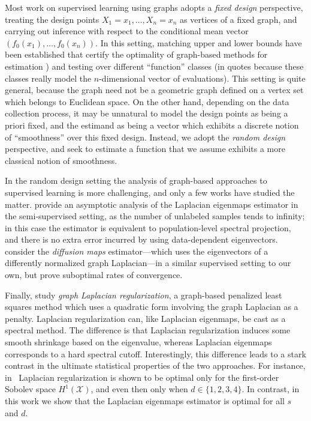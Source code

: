 \documentclass[aos]{imsart}
\theoremstyle{plain}
\theoremstyle{definition}
\theoremstyle{remark}
\newcommand{\mc}[1]{\mathcal{#1}}
\newcommand{\1}{\mathbf{1}}
\begin{document}
Most work on supervised learning using graphs adopts a \emph{fixed design} perspective, treating the design points $X_1 = x_1,\ldots,X_n = x_n$ as vertices of a fixed graph, and carrying out inference with respect to the conditional mean vector $(f_0(x_1),\ldots,f_0(x_n))$. In this setting, matching upper and lower bounds have been established that certify the optimality of graph-based methods for estimation \citep{wang2016,hutter2016,sadhanala16,sadhanala17,kirichenko2017,kirichenko2018}) and testing \citep{sharpnack2010identifying,sharpnack2013b,sharpnack2013,sharpnack2015} over different ``function'' classes (in quotes because these classes really model the $n$-dimensional vector of evaluations). This setting is quite general, because the graph need not be a geometric graph defined on a vertex set which belongs to Euclidean space. On the other hand, depending on the data collection process, it may be unnatural to model the design points as being a priori fixed, and the estimand as being a vector which exhibits a discrete notion of ``smoothness'' over this fixed design. Instead, we adopt the \emph{random design} perspective, and seek to estimate a function that we assume exhibits a more classical notion of smoothness. 

In the random design setting the analysis of graph-based approaches to supervised learning is more challenging, and only a few works have studied the matter. \cite{zhou2011} provide an asymptotic analysis of the Laplacian eigenmaps estimator in the semi-supervised setting, as the number of unlabeled samples tends to infinity; in this case the estimator is equivalent to population-level spectral projection, and there is no extra error incurred by using data-dependent eigenvectors. \cite{lee2016} consider the \emph{diffusion maps} estimator---which uses the eigenvectors of a differently normalized graph Laplacian---in a similar supervised setting to our own, but prove suboptimal rates of convergence. 

Finally, \citet{trillos2020,green2021} study \emph{graph Laplacian regularization}, a graph-based penalized least squares method which uses a quadratic form involving the graph Laplacian as a penalty. Laplacian regularization can, like Laplacian eigenmaps, be cast as a spectral method. The difference is that Laplacian regularization induces some smooth shrinkage based on the eigenvalue, whereas Laplacian eigenmaps corresponds to a hard spectral cutoff. Interestingly, this difference leads to a stark contrast in the ultimate statistical properties of the two approaches. For instance, in~\cite{green2021} Laplacian regularization is shown to be optimal only for the first-order Sobolev space $H^1(\mc{X})$, and even then only when $d \in \{1,2,3,4\}$. In contrast, in this work we show that the Laplacian eigenmaps estimator is optimal for all $s$ and $d$.
\end{document}
